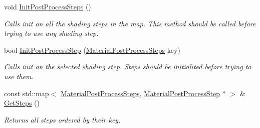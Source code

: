 \begin{DoxyCompactItemize}
void \mbox{\hyperlink{class_geometry_engine_1_1_custom_shading_1_1_material_post_process_interface_ac58496e874964aa65d6484b37fc44fcd}{Init\+Post\+Process\+Steps}} ()
\begin{DoxyCompactList}\small\item\em Calls init on all the shading steps in the map. This method should be called before trying to use any shading step. \end{DoxyCompactList}\item 
\mbox{\label{class_geometry_engine_1_1_custom_shading_1_1_material_post_process_interface_a54c049658eb7e38b980f943c193ba408}} 
bool \mbox{\hyperlink{class_geometry_engine_1_1_custom_shading_1_1_material_post_process_interface_a54c049658eb7e38b980f943c193ba408}{Init\+Post\+Process\+Step}} (\mbox{\hyperlink{namespace_geometry_engine_1_1_custom_shading_af8b09b91ca7086f4f67a5d4181f35e58}{Material\+Post\+Process\+Steps}} key)
\begin{DoxyCompactList}\small\item\em Calls init on the selected shading step. Steps should be initialited before trying to use them. \end{DoxyCompactList}\item 
\mbox{\label{class_geometry_engine_1_1_custom_shading_1_1_material_post_process_interface_a08b1e05de35b0b05579ac7f437f80cf8}} 
const std\+::map$<$ \mbox{\hyperlink{namespace_geometry_engine_1_1_custom_shading_af8b09b91ca7086f4f67a5d4181f35e58}{Material\+Post\+Process\+Steps}}, \mbox{\hyperlink{class_geometry_engine_1_1_custom_shading_1_1_material_post_process_step}{Material\+Post\+Process\+Step}} $\ast$ $>$ \& \mbox{\hyperlink{class_geometry_engine_1_1_custom_shading_1_1_material_post_process_interface_a08b1e05de35b0b05579ac7f437f80cf8}{Get\+Steps}} ()
\begin{DoxyCompactList}\small\item\em Returns all steps ordered by their key. \end{DoxyCompactList}\end{DoxyCompactItemize}
